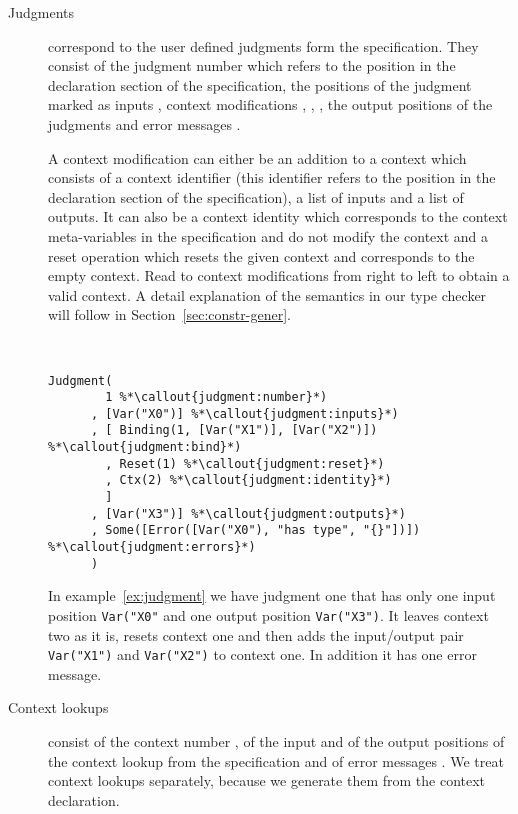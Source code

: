 \begin{description}
\item[Judgments] correspond to the user defined judgments form the
  specification. They consist of the judgment number
   which refers to the position in the
  declaration section of the specification, the positions of the
  judgment marked as inputs , context
  modifications ,
  , , the
  output positions of the judgments  and
  error messages .

  A context modification can either be an addition to a context
   which consists of a context identifier
  (this identifier refers to the position in the declaration section
  of the specification), a list of inputs and a list of outputs. It
  can also be a context identity  which
  corresponds to the context meta-variables in the specification and
  do not modify the context and a reset operation
   which resets the given context and
  corresponds to the empty context. Read to context modifications from
  right to left to obtain a valid context. A detail explanation of the
  semantics in our type checker will follow in
  Section~\ref{sec:constr-gener}.

\begin{example}{~}
\begin{lstlisting}[language=sltc]
Judgment(
        1 %*\callout{judgment:number}*)
      , [Var("X0")] %*\callout{judgment:inputs}*)
      , [ Binding(1, [Var("X1")], [Var("X2")]) %*\callout{judgment:bind}*)
        , Reset(1) %*\callout{judgment:reset}*)
        , Ctx(2) %*\callout{judgment:identity}*)
        ]
      , [Var("X3")] %*\callout{judgment:outputs}*)
      , Some([Error([Var("X0"), "has type", "{}"])]) %*\callout{judgment:errors}*)
      )
\end{lstlisting}
\label{ex:judgment}
\end{example}

In example~\ref{ex:judgment} we have judgment one that has only one
input position \verb|Var("X0"| and one output position
\verb|Var("X3")|. It leaves context two as it is, resets context one
and then adds the input/output pair \verb|Var("X1")| and
\verb|Var("X2")| to context one. In addition it has one error message.

\item[Context lookups] consist of the context number
  , of the input  and
  of the output  positions of the context
  lookup from the specification and of error messages
  . We treat context lookups separately,
  because we generate them from the context declaration.


\end{description}
